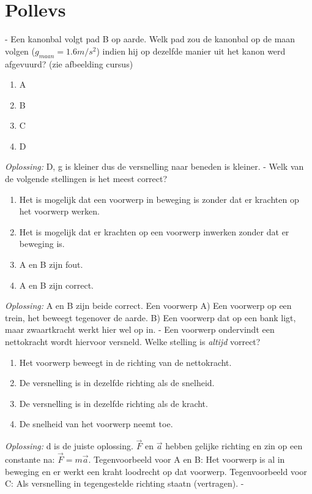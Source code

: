 \documentclass[12pt,a4paper]{article}
\begin{document}
    \section{Pollevs}
    - Een kanonbal volgt pad B op aarde. Welk pad zou de kanonbal op de maan volgen (\(g_{maan} = 1.6m/s^2\)) indien hij op dezelfde manier uit het kanon werd afgevuurd? (zie afbeelding cursus)
    \begin{enumerate}
        [label=\alph*)]
        \item A
        \item B
        \item C
        \item D
    \end{enumerate}
    \textit{Oplossing:} D, g is kleiner dus de versnelling naar beneden is kleiner.
    \newline
    - Welk van de volgende stellingen is het meest correct?
    \begin{enumerate}[label=\alph*]
        \item Het is mogelijk dat een voorwerp in beweging is zonder dat er krachten op het voorwerp werken.
        \item Het is mogelijk dat er krachten op een voorwerp inwerken zonder dat er beweging is.
        \item A en B zijn fout.
        \item A en B zijn correct.
    \end{enumerate}
    \textit{Oplossing:} A en B zijn beide correct. Een voorwerp A) Een voorwerp op een trein, het beweegt tegenover de aarde. B) Een voorwerp dat op een bank ligt, maar zwaartkracht werkt hier wel op in.
    - Een voorwerp ondervindt een nettokracht wordt hiervoor versneld. Welke stelling is \textit{altijd} vorrect?
    \begin{enumerate}[label=\alph*]
        \item Het voorwerp beweegt in de richting van de nettokracht.
        \item De versnelling is in dezelfde richting als de snelheid.
        \item De versnelling is in dezelfde richting als de kracht.
        \item De snelheid van het voorwerp neemt toe.
    \end{enumerate}
    \textit{Oplossing:} d is de juiste oplossing. $\vec{F}$ en $\vec{a}$ hebben gelijke richting en zin op een constante na: \(\vec{F} = m\vec{a}\). Tegenvoorbeeld voor A en B: Het voorwerp is al in beweging en er werkt een kraht loodrecht op dat voorwerp. Tegenvoorbeeld voor C: Als versnelling in tegengestelde richting staatn (vertragen).
    -
    \newpage
\end{document}
